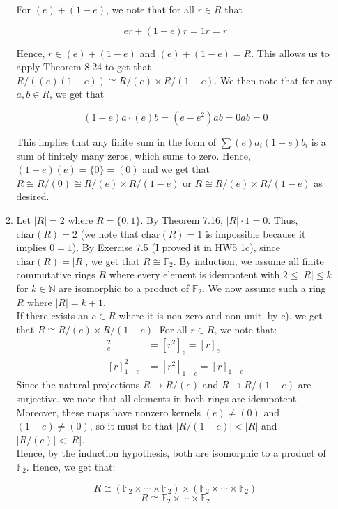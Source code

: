 \documentclass{article}
\begin{document}
\begin{enumerate}
\begin{enumerate}
   For $(e) + (1-e)$, we note that for all $r \in R$ that 
   
   $$er + (1-e)r = 1r = r$$
   
   Hence, $r \in (e) + (1 -e)$ and $(e) + (1 - e) = R$. This allows us to apply Theorem 8.24 to get that $R/((e)(1-e)) \cong R/(e) \times R/(1-e)$. We then note that for any $a, b \in R$, we get that 
   
   $$(1-e)a\cdot(e)b = (e-e^2)ab = 0ab = 0$$

   This implies that any finite sum in the form of $\sum (e)a_i(1-e)b_i$ is a sum of finitely many zeros, which sums to zero. Hence, $(1-e)(e) = \{0\} = (0)$ and we get that $R \cong R/(0) \cong R/(e) \times R/(1-e)$ or $R \cong R/(e) \times R/(1-e)$ as desired. \\

    \item 
    Let $|R| = 2$ where $R = \{0, 1\}$. By Theorem 7.16, $|R| \cdot 1 = 0$. Thus, $\text{char}(R) = 2$ (we note that $\text{char}(R) = 1$ is impossible because it implies $0 = 1$). By Exercise 7.5 (I proved it in HW5 1c), since $\text{char}(R) = |R|$, we get that $R \cong \mathbb{F}_2$. By induction, we assume all finite commutative rings $R$ where every element is idempotent with $2 \leq |R| \leq k$ for $k \in \mathbb{N}$ are isomorphic to a product of $\mathbb{F}_2$. We now assume such a ring $R$ where $|R| = k + 1$. \\

    If there exists an $e \in R$ where it is non-zero and non-unit, by c), we get that $R \cong R/(e) \times R/(1-e)$. For all $r \in R$, we note that:
    \begin{align*}
        [r]_e^2 &= [r^2]_e = [r]_e \\
        [r]_{1-e}^2 &= [r^2]_{1-e} = [r]_{1-e}
    \end{align*}
    Since the natural projections $R \rightarrow R/(e)$ and $R \rightarrow R/(1-e)$ are surjective, we note that all elements in both rings are idempotent. Moreover, these maps have nonzero kernels $(e)\neq(0)$ and $(1-e)\neq(0)$, so it must be that $|R/(1-e)| < |R|$ and $|R/(e)| < |R|$. \\
  
    Hence, by the induction hypothesis, both are isomorphic to a product of $\mathbb{F}_2$. Hence, we get that: 

    $$R \cong (\mathbb{F}_2 \times \cdots \times \mathbb{F}_2 ) \times (\mathbb{F}_2 \times \cdots \times \mathbb{F}_2 ) $$
    $$R \cong \mathbb{F}_2 \times \cdots \times \mathbb{F}_2  $$


\end{enumerate}
\end{enumerate}
\end{document}
